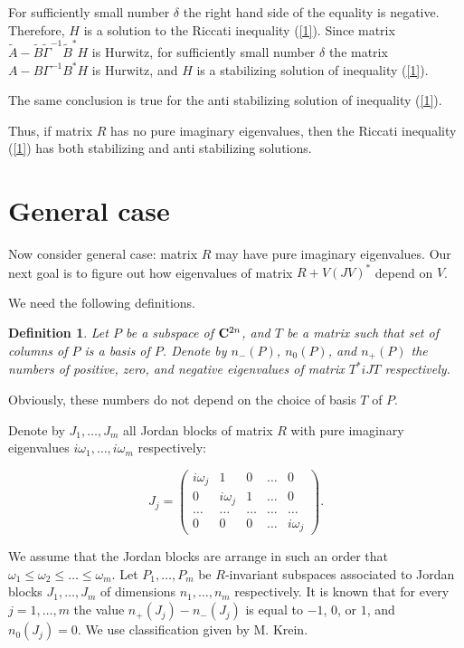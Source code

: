 \documentclass[11pt, reqno]{amsart}
\theoremstyle{plain}
\newtheorem{definition}[theorem]{Definition}
\begin{document}
\noindent For sufficiently small number $\delta$ the right hand side of the equality is negative. Therefore, $H$ is a solution to the Riccati inequality (\ref{1}). Since matrix $\tilde A - \tilde B\tilde\Gamma^{-1}\tilde B^{*}H$ is Hurwitz, for sufficiently small number $\delta$ the matrix $A-B\Gamma^{-1}B^{*}H$ is Hurwitz, and $H$ is a stabilizing solution of inequality (\ref{1}).

The same conclusion is true for the anti stabilizing solution of inequality (\ref{1}).

Thus, if matrix $R$ has no pure imaginary eigenvalues, then the Riccati inequality (\ref{1}) has both stabilizing and anti stabilizing solutions.


\section{General case}

Now consider general case: matrix $R$ may have pure imaginary eigenvalues. Our next goal is to figure out how eigenvalues of matrix $R+V(JV)^{*}$ depend on $V$.

We need the following definitions. 

\begin{definition} Let $P$ be a subspace of ${\bf C}^{2n}$, and $T$ be a matrix such that set of columns of $P$ is a basis of $P$. Denote by $n_{-}(P)$, $n_{0}(P)$, and $n_{+}(P)$ the numbers of positive, zero, and negative eigenvalues of matrix $T^{*}iJT$ respectively. 
\end{definition}

Obviously, these numbers do not depend on the choice of basis $T$ of $P$.

Denote by $J_{1},\ldots,J_{m}$ all Jordan blocks of matrix $R$ with pure imaginary eigenvalues $i\omega_{1},\ldots,i\omega_{m}$ respectively:

$$ J_{j} = \left(\begin{array}{ccccc} i\omega_{j} & 1 & 0 & \ldots & 0 \\
0 & i\omega_{j} & 1 & \ldots & 0 \\ \ldots & \ldots & \ldots & \ldots & \ldots \\ 0 & 0 & 0 & \ldots & i\omega_{j} \end{array}\right).
$$

\noindent We assume that the Jordan blocks are arrange in such an order that $\omega_{1}\le\omega_{2}\le\ldots\le\omega_{m}$. Let $P_{1},\ldots,P_{m}$ be $R$-invariant subspaces associated to Jordan blocks $J_{1},\ldots,J_{m}$ of dimensions $n_{1},\ldots,n_{m}$ respectively. It is known that for every $j=1,\ldots,m$ the value $n_{+}(J_{j})-n_{-}(J_{j})$ is equal to $-1$, $0$, or $1$, and $n_{0}(J_{j})=0$. We use classification given by M. Krein.
\end{document}
